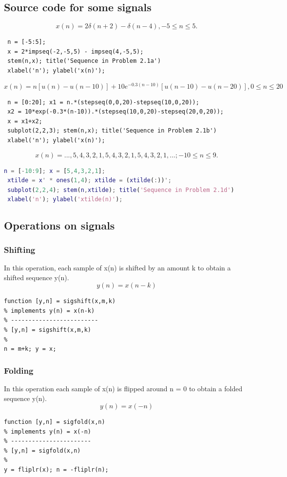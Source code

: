 \documentclass{article}
\begin{document}
\subsection{Source code for some signals}
\begin{equation}
x(n) = 2\delta(n+2)-\delta(n-4), -5\leq n \leq 5.
\end{equation}
\begin{lstlisting}
 n = [-5:5];
 x = 2*impseq(-2,-5,5) - impseq(4,-5,5);
 stem(n,x); title('Sequence in Problem 2.1a')
 xlabel('n'); ylabel('x(n)');    
\end{lstlisting}
\begin{equation}
x(n) = n[u(n)-u(n-10)]+10e^{-0.3(n-10)}[u(n-10)-u(n-20)], 0 \leq n \leq 20
\end{equation}
\begin{lstlisting}
 n = [0:20]; x1 = n.*(stepseq(0,0,20)-stepseq(10,0,20));
 x2 = 10*exp(-0.3*(n-10)).*(stepseq(10,0,20)-stepseq(20,0,20));
 x = x1+x2;
 subplot(2,2,3); stem(n,x); title('Sequence in Problem 2.1b')
 xlabel('n'); ylabel('x(n)');
\end{lstlisting}
\begin{equation}
x(n) = {..., 5, 4, 3, 2, 1, 5, 4, 3, 2, 1, 5, 4, 3, 2, 1, ...}; -10 \leq n \leq 9.
\end{equation}
\begin{lstlisting}[language=MATLAB]
 n = [-10:9]; x = [5,4,3,2,1];
 xtilde = x' * ones(1,4); xtilde = (xtilde(:))';
 subplot(2,2,4); stem(n,xtilde); title('Sequence in Problem 2.1d')
 xlabel('n'); ylabel('xtilde(n)');
\end{lstlisting}

\subsection{Operations on signals}
\subsubsection{Shifting}
In this operation, each sample of x(n) is shifted by an
amount k to obtain a shifted sequence y(n).
\begin{equation}
y(n) = {x(n-k)}
\end{equation}
\begin{lstlisting}
function [y,n] = sigshift(x,m,k)
% implements y(n) = x(n-k)
% -------------------------
% [y,n] = sigshift(x,m,k)
%
n = m+k; y = x;
\end{lstlisting}
\subsubsection{Folding}
In this operation each sample of x(n) is flipped around n = 0
to obtain a folded sequence y(n).
\begin{equation}
y(n) = {x(-n)}
\end{equation}
\begin{lstlisting}
function [y,n] = sigfold(x,n)
% implements y(n) = x(-n)
% -----------------------
% [y,n] = sigfold(x,n)
%
y = fliplr(x); n = -fliplr(n);    
\end{lstlisting}
\end{document}

